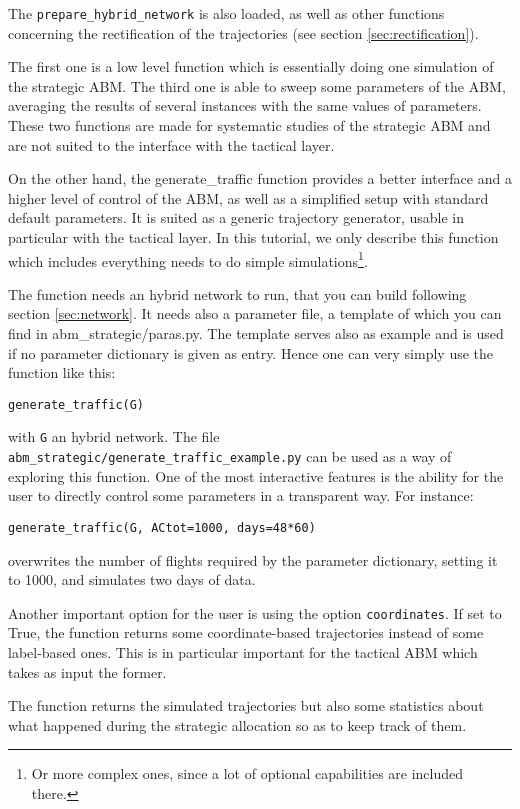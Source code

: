 \documentclass[12pt]{article}
\begin{document}
The \verb|prepare_hybrid_network| is also loaded, as well as other functions concerning the rectification of the trajectories (see section \ref{sec:rectification}).

The first one is a low level function which is essentially doing one simulation of the strategic ABM. The third one is able to sweep some parameters of the ABM, averaging the results of several instances with the same values of parameters. These two functions are made for systematic studies of the strategic ABM and are not suited to the interface with the tactical layer.

On the other hand, the generate\_traffic function provides a better interface and a higher level of control of the ABM, as well as a simplified setup with standard default parameters. It is suited as a generic trajectory generator, usable in particular with the tactical layer. In this tutorial, we only describe this function which includes everything needs to do simple simulations\footnote{Or more complex ones, since a lot of optional capabilities are included there.}.

The function needs an hybrid network to run, that you can build following section \ref{sec:network}. It needs also a parameter file, a template of which you can find in abm\_strategic/paras.py. The template serves also as example and is used if no parameter dictionary is given as entry. Hence one can very simply use the function like this:
\begin{verbatim}
generate_traffic(G)
\end{verbatim}
with \verb|G| an hybrid network. The file \verb|abm_strategic/generate_traffic_example.py| can be used as a way of exploring this function. One of the most interactive features is the ability for the user to directly control some parameters in a transparent way. For instance:
\begin{verbatim}
generate_traffic(G, ACtot=1000, days=48*60)
\end{verbatim}
overwrites the number of flights required by the parameter dictionary, setting it to 1000, and simulates two days of data.

Another important option for the user is using the option \verb|coordinates|. If set to True, the function returns some coordinate-based trajectories instead of some label-based ones. This is in particular important for the tactical ABM which takes as input the former.

The function returns the simulated trajectories but also some statistics about what happened during the strategic allocation so as to keep track of them.
\end{document}
